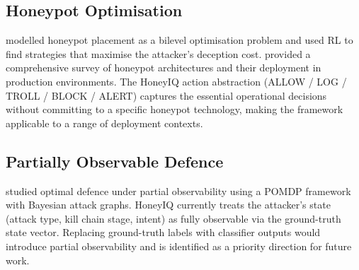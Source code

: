 \subsection{Honeypot Optimisation}

\citet{shi2021learning} modelled honeypot placement as a bilevel optimisation
problem and used RL to find strategies that maximise the attacker's deception
cost.
\citet{franco2021survey} provided a comprehensive survey of honeypot
architectures and their deployment in production environments.
The HoneyIQ action abstraction (ALLOW / LOG / TROLL / BLOCK / ALERT) captures
the essential operational decisions without committing to a specific honeypot
technology, making the framework applicable to a range of deployment contexts.

\subsection{Partially Observable Defence}

\citet{miehling2018optimal} studied optimal defence under partial observability
using a POMDP framework with Bayesian attack graphs.
HoneyIQ currently treats the attacker's state (attack type, kill chain stage,
intent) as fully observable via the ground-truth state vector.
Replacing ground-truth labels with classifier outputs would introduce partial
observability and is identified as a priority direction for future work.
